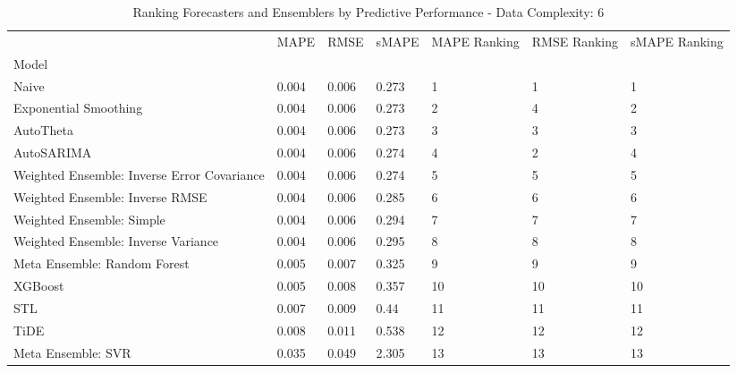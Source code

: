 \begin{table}
\caption{Ranking Forecasters and Ensemblers by Predictive Performance - Data Complexity: 6}
\begin{tabular}{lllllll}
\toprule
 & MAPE & RMSE & sMAPE & MAPE Ranking & RMSE Ranking & sMAPE Ranking \\
Model &  &  &  &  &  &  \\
\midrule
Naive & 0.004 & 0.006 & 0.273 & 1 & 1 & 1 \\
Exponential Smoothing & 0.004 & 0.006 & 0.273 & 2 & 4 & 2 \\
AutoTheta & 0.004 & 0.006 & 0.273 & 3 & 3 & 3 \\
AutoSARIMA & 0.004 & 0.006 & 0.274 & 4 & 2 & 4 \\
Weighted Ensemble: Inverse Error Covariance & 0.004 & 0.006 & 0.274 & 5 & 5 & 5 \\
Weighted Ensemble: Inverse RMSE & 0.004 & 0.006 & 0.285 & 6 & 6 & 6 \\
Weighted Ensemble: Simple & 0.004 & 0.006 & 0.294 & 7 & 7 & 7 \\
Weighted Ensemble: Inverse Variance & 0.004 & 0.006 & 0.295 & 8 & 8 & 8 \\
Meta Ensemble: Random Forest & 0.005 & 0.007 & 0.325 & 9 & 9 & 9 \\
XGBoost & 0.005 & 0.008 & 0.357 & 10 & 10 & 10 \\
STL & 0.007 & 0.009 & 0.44 & 11 & 11 & 11 \\
TiDE & 0.008 & 0.011 & 0.538 & 12 & 12 & 12 \\
Meta Ensemble: SVR & 0.035 & 0.049 & 2.305 & 13 & 13 & 13 \\
\bottomrule
\end{tabular}
\end{table}
